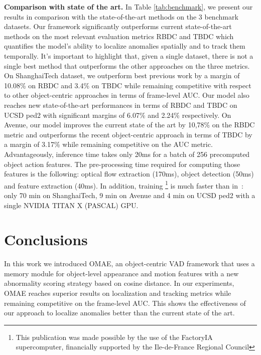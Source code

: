 \documentclass{article}
\begin{document}
\noindent\textbf{Comparison with state of the art.} In Table \ref{tab:benchmark}, we present our results in comparison with the state-of-the-art methods on the 3 benchmark datasets. Our framework significantly outperforms current state-of-the-art methods on the most relevant evaluation metrics RBDC and TBDC which quantifies the model's ability to localize anomalies spatially and to track them temporally. It's important to highlight that, given a single dataset, there is not a single best method that outperforms the other approaches on the three metrics. On ShanghaiTech dataset, we outperform best previous work by a margin of 10.08\% on RBDC and 3.4\% on TBDC while remaining competitive with respect to other object-centric approaches in terms of frame-level AUC. Our model also reaches new state-of-the-art performances in terms of RBDC and TBDC on UCSD ped2 with significant margins of  6.07\% and 2.24\% respectively.  On Avenue, our model improves the current state of the art by 10,78\% on the RBDC metric and outperforms the recent object-centric approach \cite{baf} in terms of TBDC by a margin of 3.17\% while remaining competitive on the AUC metric. Advantageously, inference time takes only 20ms for a batch of 256 precomputed object action features. The pre-processing time required for computing those features is the following: optical flow
extraction (170ms), object detection (50ms) and feature extraction (40ms). In addition, training \footnote[3]{This publication was made possible by the use of the FactoryIA supercomputer, financially supported by the Ile-de-France Regional Council} is much faster than in~\cite{mnad}: only 70 min on ShanghaiTech, 9 min on Avenue and 4 min on UCSD ped2 with a single NVIDIA TITAN X (PASCAL) GPU.

\section{Conclusions}
In this work we introduced OMAE, an object-centric VAD framework that uses a memory module for object-level appearance and motion features  with a new abnormality scoring strategy based on cosine distance. In our experiments, OMAE reaches superior results on localization and tracking metrics while remaining competitive on the frame-level AUC. This shows the effectiveness of our approach to localize anomalies better than the current state of the art.




\end{document}
